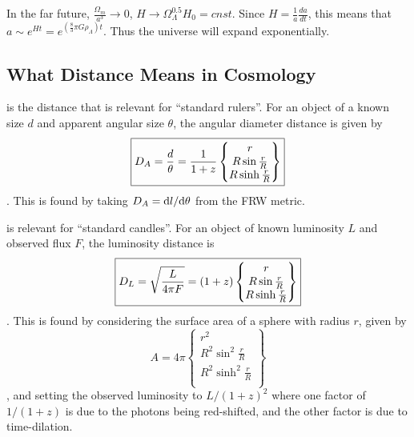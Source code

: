 In the far future, $\frac{\Omega_m}{a^3} \rightarrow 0$, $H \rightarrow \Omega_\Lambda^{0.5}H_0  = cnst$.  Since $H = \frac{1}{a}\frac{da}{dt}$, this means that $a \sim e^{Ht} = e^{\left(\frac{8}{3}\pi G\rho_\Lambda \right)t}$.  Thus the universe will expand exponentially.






\subsection{What Distance Means in Cosmology}
 is the distance that is relevant for
``standard rulers''.  For an object of a known size $d$ and apparent angular size $\theta$,
the angular diameter distance is given by
\begin{dmath}\boxed{
    D_A = \frac{d}{\theta} \nolinebreak = \frac{1}{1+z} \left\{\begin{matrix}
                r \\ R\sin\frac{r}{R} \\ R\sinh\frac{r}{R} \\
            \end{matrix}\right\}
}\end{dmath}.
This is found by taking $D_A = {\rm d} l/{\rm d}\theta$ from the FRW metric.

 is relevant for ``standard candles''.  For an object of
known luminosity $L$ and observed flux $F$, the luminosity distance is
\begin{dmath}\boxed{
    D_L = \sqrt{\frac{L}{4\pi F}} \nolinebreak
        = (1+z) \left\{\begin{matrix}
                r \\ R\sin\frac{r}{R} \\ R\sinh\frac{r}{R} \\
            \end{matrix}\right\}
}\end{dmath}.
This is found by considering the surface area of a sphere with radius $r$, given by
\begin{dmath}
    A = 4\pi\left\{\begin{matrix}
            r^2 \\ R^2\sin^2\frac{r}{R} \\ R^2\sinh^2\frac{r}{R} \\
        \end{matrix}\right\}
\end{dmath},
and setting the observed luminosity to $L/(1+z)^2$ where one factor of $1/(1+z)$ is due to
the photons being red-shifted, and the other factor is due to time-dilation.

